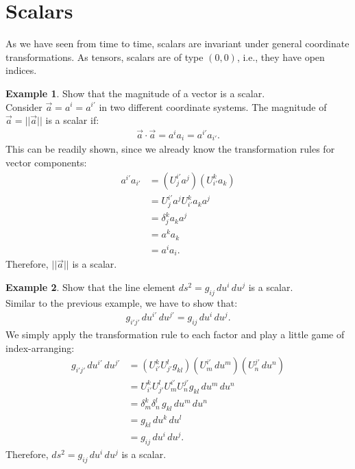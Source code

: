 \documentclass{book}
\theoremstyle{definition}
\newtheorem{exmp}{Example}[section]
\begin{document}
\section{Scalars}
As we have seen from time to time, scalars are invariant under general coordinate transformations. As tensors, scalars are of type $(0,0)$, i.e., they have open indices.
\begin{exmp}
	Show that the magnitude of a vector is a scalar.\\
	
	Consider $\vec{a} = {a^i} = {a^{i'}}$ in two different coordinate systems. The magnitude of $\vec{a} = \vert\vert \vec{a} \vert\vert$ is a scalar if:
	\begin{align*}
	\vec{a}\cdot\vec{a} = a^ia_i = a^{i'}a_{i'}.
	\end{align*} 
	This can be readily shown, since we already know the transformation rules for vector components:
	\begin{align*}
	a^{i'}a_{i'} &= \left( U^{i'}_j a^j \right) \left( U^{k}_{i'}a_k\right) \\
	&= U^{i'}_j a^j U^{k}_{i'} a_k a^j\\
	&= \delta^{k}_j a_k a^j\\
	&= a^k a_k\\
	&= a^i a_i.
	\end{align*}
	Therefore, $\vert\vert \vec{a} \vert\vert$ is a scalar.
\end{exmp}
\begin{exmp}
	Show that the line element $ds^2 = g_{ij}\,du^i\,du^j$ is a scalar. \\
	
	Similar to the previous example, we have to show that:
	\begin{align*}
	g_{i'j'}\,du^{i'}\,du^{j'} = g_{ij}\,du^i\,du^j.
	\end{align*}
	We simply apply the transformation rule to each factor and play a little game of index-arranging:
	\begin{align*}
	g_{i'j'}\,du^{i'}\,du^{j'} &= \left( U^k_{i'} U^l_{j'} g_{kl}\right) \left(U^{i'}_m \,du^m \right) \left(U^{j'}_n \,du^n\right) \\
	&= U^k_{i'} U^l_{j'} U^{i'}_m U^{j'}_n g_{kl}\,du^m\,du^n\\
	&= \delta^k_m\delta^l_n \,g_{kl}\,du^m\,du^n\\
	&= g_{kl}\,du^k\,du^l\\
	&= g_{ij}\,du^i\,du^j.
	\end{align*}
	Therefore, $ds^2 = g_{ij}\,du^i\,du^j$ is a scalar.
\end{exmp}
\end{document}
